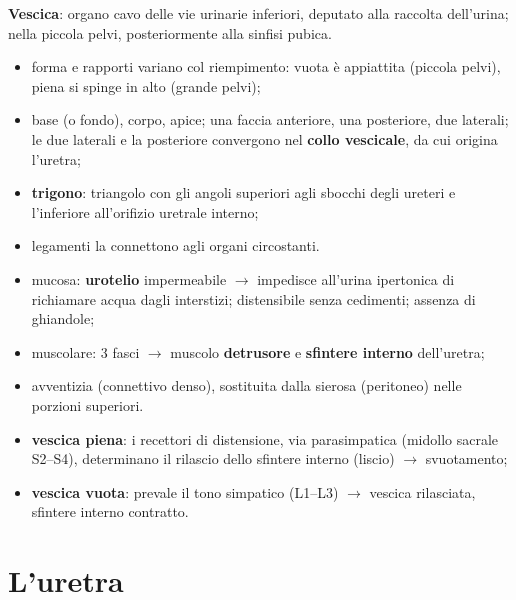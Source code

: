 \textbf{Vescica}: organo cavo delle vie urinarie inferiori, deputato alla raccolta dell'urina; nella
piccola pelvi, posteriormente alla sinfisi pubica.
\begin{itemize}
  \item forma e rapporti variano col riempimento: vuota è appiattita (piccola pelvi), piena si spinge
    in alto (grande pelvi);
  \item base (o fondo), corpo, apice; una faccia anteriore, una posteriore, due laterali; le due
    laterali e la posteriore convergono nel \textbf{collo vescicale}, da cui origina l'uretra;
  \item \textbf{trigono}: triangolo con gli angoli superiori agli sbocchi degli ureteri e l'inferiore
    all'orifizio uretrale interno;
  \item legamenti la connettono agli organi circostanti.
\end{itemize}

\begin{itemize}
  \item mucosa: \textbf{urotelio} impermeabile $\rightarrow$ impedisce all'urina ipertonica di
    richiamare acqua dagli interstizi; distensibile senza cedimenti; assenza di ghiandole;
  \item muscolare: 3 fasci $\rightarrow$ muscolo \textbf{detrusore} e \textbf{sfintere interno}
    dell'uretra;
  \item avventizia (connettivo denso), sostituita dalla sierosa (peritoneo) nelle porzioni superiori.
\end{itemize}

\begin{itemize}
  \item \textbf{vescica piena}: i recettori di distensione, via parasimpatica (midollo sacrale
    S2--S4), determinano il rilascio dello sfintere interno (liscio) $\rightarrow$ svuotamento;
  \item \textbf{vescica vuota}: prevale il tono simpatico (L1--L3) $\rightarrow$ vescica rilasciata,
    sfintere interno contratto.
\end{itemize}

\section{L'uretra}

